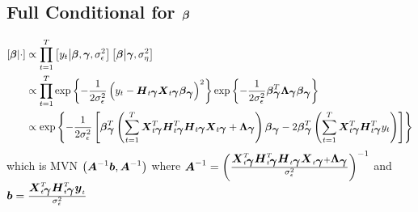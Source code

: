 \documentclass[fleqn]{article}
\def\bm#1{\mbox{\boldmath $#1$}}
\begin{document}
\subsection{Full Conditional for $\bm{\beta}$}
%
\begin{align*}
%
\left[ \bm{\beta} \middle| \cdot \right] & \propto \prod_{t = 1}^T \left[ y_t \middle| \bm{\beta}, \bm{\gamma}, \sigma^2_\epsilon \right] \left[ \bm{\beta} \middle|  \bm{\gamma}, \sigma^2_\eta \right] \\
%
 & \propto \prod_{t = 1}^T \exp{ \left\{ - \frac{1} {2 \sigma^2_\epsilon} \left( y_t - \bm{H}_{t \bm{\gamma}} \bm{X}_{t \bm{\gamma}} \bm{\beta}_{\bm{\gamma}} \right)^2 \right\} } \exp{ \left\{ - \frac{1} {2 \sigma^2_\epsilon} \bm{\beta}_{\bm{\gamma}}^T \bm{\Lambda}_{\bm{\gamma}} \bm{\beta}_{\bm{\gamma}} \right\} } \\
%
 & \propto \exp{ \left\{ - \frac{1} {2 \sigma^2_\epsilon} \left[ \bm{\beta}_{\bm{\gamma}}^T \left(\sum_{t = 1}^T \bm{X}_{t \bm{\gamma}}^T \bm{H}_{t \bm{\gamma}}^T \bm{H}_{t \bm{\gamma}} \bm{X}_{t \bm{\gamma}} + \bm{\Lambda}_{\bm{\gamma}} \right) \bm{\beta}_{\bm{\gamma}} - 2 \bm{\beta}_{\bm{\gamma}}^T \left( \sum_{t = 1}^T \bm{X}_{t \bm{\gamma}}^T \bm{H}_{t \bm{\gamma}}^T y_t \right) \right] \right\} } \\
%
\end{align*}
%
which is MVN $\left( \bm{A}^{ - 1} \bm{b}, \bm{A}^{ - 1} \right)$ where $\bm{A}^{ - 1} = \left( \frac{\bm{X}_{t \bm{\gamma}}^T \bm{H}_{t \bm{\gamma}}^T \bm{H}_{t \bm{\gamma}} \bm{X}_{t \bm{\gamma}} + \bm{\Lambda}_{\bm{\gamma}}} {\sigma^2_\epsilon} \right)^{ - 1}$ and $\bm{b} = \frac{\bm{X}_{t \bm{\gamma}}^T \bm{H}_{t \bm{\gamma}}^T \bm{y}_t} {\sigma^2_\epsilon}$
%
\end{document}
